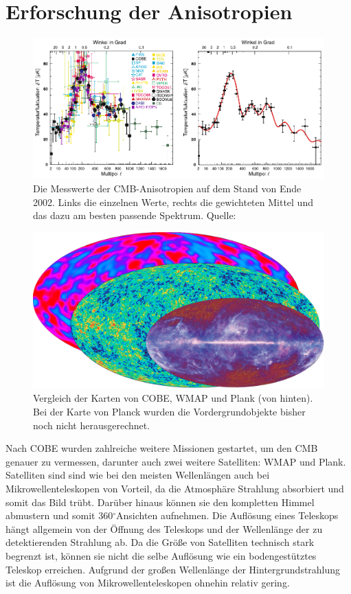 \documentclass[10pt,a4paper]{article}
\newcommand{\degree}{$^\circ$}
\begin{document}
\section{Erforschung der Anisotropien}\label{Missionen}
\begin{figure}
\center
\includegraphics[scale=1]{mess}
\caption{Die Messwerte der CMB-Anisotropien auf dem Stand von Ende 2002. Links die einzelnen Werte, rechts die gewichteten Mittel und das dazu am besten passende Spektrum. Quelle: \cite{Schneider}}
\label{mess}
\end{figure}

\begin{figure}
\center
\includegraphics[scale=0.15]{CMB}
\caption{Vergleich der Karten von COBE, WMAP und Plank (von hinten). Bei der Karte von Planck wurden die Vordergrundobjekte bisher noch nicht herausgerechnet.}
\label{cmb}
\end{figure}

Nach COBE wurden zahlreiche weitere Missionen gestartet, um den CMB genauer zu vermessen, darunter auch zwei weitere Satelliten: WMAP und Plank.
Satelliten sind sind wie bei den meisten Wellenlängen auch bei Mikrowellenteleskopen von Vorteil, da die Atmosphäre Strahlung absorbiert und somit das Bild trübt. Darüber hinaus können sie den kompletten Himmel abmustern und somit 360\degree Ansichten aufnehmen. Die Auflösung eines Teleskops hängt allgemein von der Öffnung des Teleskops und der Wellenlänge der zu detektierenden Strahlung ab. Da die Größe von Satelliten technisch stark begrenzt ist, können sie nicht die selbe Auflösung wie ein bodengestütztes Teleskop erreichen. Aufgrund der großen Wellenlänge der Hintergrundstrahlung ist die Auflösung von Mikrowellenteleskopen ohnehin relativ gering.
\end{document}
